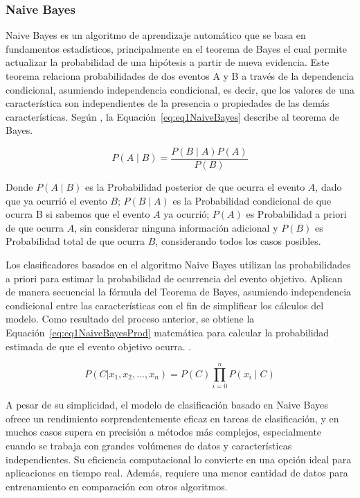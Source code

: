 \documentclass[11pt,a4paper,spanish]{book}
\numberwithin{equation}{chapter}
\numberwithin{figure}{chapter}
\begin{document}
\subsubsection{Naive Bayes}

Naive Bayes es un algoritmo de aprendizaje automático que se basa en fundamentos estadísticos, principalmente en el teorema de Bayes el cual permite actualizar la probabilidad de una hipótesis a partir de nueva evidencia. Este teorema relaciona probabilidades de dos eventos A y B a través de la dependencia condicional, asumiendo independencia condicional, es decir, que los valores de una característica son independientes de la presencia o propiedades de las demás características. Según \cite{han2012datamining}, la Equación~\ref{eq:eq1NaiveBayes} describe al teorema de Bayes.


\begin{equation}\label{eq:eq1NaiveBayes}
P(A \mid B) = \frac{P(B \mid A) P(A)}{P(B)}
\end{equation}


Donde $P(A \mid B)$ es la Probabilidad posterior de que ocurra el evento $A$, dado que ya ocurrió el evento $B$; $P(B \mid A)$ es la Probabilidad condicional de que ocurra B si sabemos que el evento $A$ ya ocurrió; $P(A)$ es Probabilidad a priori de que ocurra $A$, sin considerar ninguna información adicional y $P(B)$ es Probabilidad total de que ocurra $B$, considerando todos los casos posibles.


Los clasificadores basados en el algoritmo Naive Bayes utilizan las probabilidades a priori para estimar la probabilidad de ocurrencia del evento objetivo. Aplican de manera secuencial la fórmula del Teorema de Bayes, asumiendo independencia condicional entre las características con el fin de simplificar los cálculos del modelo. Como resultado del proceso anterior, se obtiene la Equación~\ref{eq:eq1NaiveBayesProd} matemática para calcular la probabilidad estimada de que el evento objetivo ocurra. \cite{salman2024rf}. 


\begin{equation}\label{eq:eq1NaiveBayesProd}
P(C|x_1, x_2, ..., x_n) = P(C) \prod_{i = 0}^{n} P(x_i \mid C)
\end{equation}


A pesar de su simplicidad, el modelo de clasificación basado en Naive Bayes ofrece un rendimiento sorprendentemente eficaz en tareas de clasificación, y en muchos casos supera en precisión a métodos más complejos, especialmente cuando se trabaja con grandes volúmenes de datos y características independientes. Su eficiencia computacional lo convierte en una opción ideal para aplicaciones en tiempo real. Además, requiere una menor cantidad de datos para entrenamiento en comparación con otros algoritmos.
\end{document}
